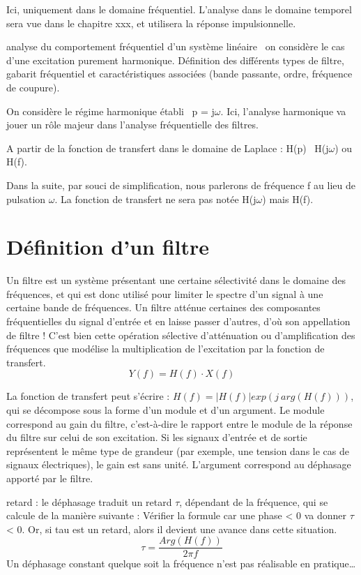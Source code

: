\documentclass[]{report}
\begin{document}
	Ici, uniquement dans le domaine fréquentiel. L'analyse dans le domaine
	temporel sera vue dans le chapitre xxx, et utilisera la réponse
	impulsionnelle.
	
	analyse du comportement fréquentiel d'un système linéaire~ on considère
	le cas d'une excitation purement harmonique. Définition des différents
	types de filtre, gabarit fréquentiel et caractéristiques associées
	(bande passante, ordre, fréquence de coupure).
	
	On considère le régime harmonique établi~ p = j$\omega$. Ici, l'analyse
	harmonique va jouer un rôle majeur dans l'analyse fréquentielle des
	filtres.
	
	A partir de la fonction de transfert dans le domaine de Laplace : H(p)~
	H(j$\omega$) ou H(f).
	
	Dans la suite, par souci de simplification, nous parlerons de fréquence
	f au lieu de pulsation $ \omega $. La fonction de transfert ne sera pas notée
	H(j$ \omega $) mais H(f).
	
	\section{Définition d'un filtre}
	Un filtre est un système présentant une certaine sélectivité dans le domaine des fréquences, et qui est donc utilisé pour limiter le spectre d’un signal à une certaine bande de fréquences.
	Un filtre atténue certaines des composantes fréquentielles du signal d’entrée et en laisse passer d’autres, d’où son appellation de filtre ! C’est bien cette opération sélective d’atténuation ou d’amplification des fréquences que modélise la multiplication de l'excitation par la fonction de transfert.
	\begin{equation}\label{}
	Y(f) = H(f) \cdot X(f)
	\end{equation}

	La fonction de transfert peut s'écrire : $ H(f) = |H(f)|exp(j~arg(H(f)))$, qui se décompose sous la forme d'un module et d'un argument. Le module correspond au gain du filtre, c'est-à-dire le rapport entre le module de la réponse du filtre sur celui de son excitation. Si les signaux d'entrée et de sortie représentent le même type de grandeur (par exemple, une tension dans le cas de signaux électriques), le gain est sans unité. L'argument correspond au déphasage apporté par le filtre.
	
	retard : le déphasage traduit un retard $ \tau $, dépendant de la fréquence,
	qui se calcule de la manière suivante : Vérifier la formule car une
	phase \textless{} 0 va donner $\tau$ \textless{} 0. Or, si tau est un
	retard, alors il devient une avance dans cette situation.
	\begin{equation}\label{}
	\tau = \frac{Arg(H(f))}{2\pi f}
	\end{equation}
	Un déphasage constant quelque soit la fréquence n'est pas réalisable en pratique…
	
\end{document}
